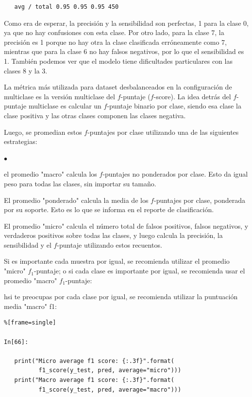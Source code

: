 {\begin{lstlisting}
   avg / total 0.95 0.95 0.95 450

\end{lstlisting}

Como era de esperar, la precisión y la sensibilidad son  perfectas, 1 para la clase 0, ya que no hay confusiones con esta clase. Por otro lado, para la clase 7,  la precisión es 1 porque no hay otra
la clase  clasificada  erróneamente como 7, mientras que para la clase 6 no hay falsos negativos, por lo que
el sensibilidad es 1. También podemos ver que el modelo tiene dificultades particulares con las clases 8
y la 3.

La métrica más utilizada para dataset desbalanceados  en la configuración de multiclase es
la versión multiclase del $f$-puntaje ($f$-score). La idea detrás del $f$-puntaje  multiclase es 
calcular un $f$-puntaje binario por clase, siendo esa clase la clase positiva y las otras
clases componen las clases negativa.

Luego, se promedian estos $f$-puntajes  por clase utilizando una de las siguientes estrategias:
 
 \begin{list}{$\bullet$}{}  
 \item el promedio "{}macro"{}  calcula  los  $f$-puntajes  no ponderados por clase. Esto da igual
 peso para todas las clases, sin importar su tamaño.

	\item  El promedio "{}ponderado"{}  calcula la media de los  $f$-puntajes  por clase, ponderada por
 su soporte. Esto es lo que se informa en el  reporte   de clasificación.
	
	\item   El promedio "{}micro"{}  calcula el número total de falsos positivos, falsos negativos,
 y verdaderos positivos sobre todas las clases, y luego calcula la precisión, la sensibilidad y el $f$-puntaje  utilizando estos recuentos.

\end{list}Si es importante cada muestra por igual, se recomienda utilizar el promedio "{}micro"{}  $f_{1}$-puntaje; o  si   cada clase es importante por igual, se recomienda usar el promedio "macro"
$f_{1}$-puntaje:

hsi te preocupas por cada clase por igual, se recomienda utilizar
la puntuación media "macro" f1:
\begin{lstlisting}%[frame=single]

In[66]:

   print("Micro average f1 score: {:.3f}".format(
          f1_score(y_test, pred, average="micro")))
   print("Macro average f1 score: {:.3f}".format(
          f1_score(y_test, pred, average="macro")))


\end{lstlisting}}

